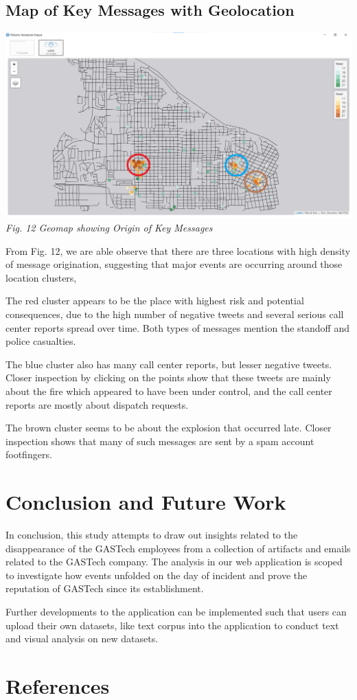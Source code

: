 \documentclass{acm_proc_article-sp}
\begin{document}
\hypertarget{map-of-key-messages-with-geolocation}{%
\subsection{Map of Key Messages with
Geolocation}\label{map-of-key-messages-with-geolocation}}

\includegraphics{img/image11.png} \emph{Fig. 12 Geomap showing Origin of
Key Messages}

From Fig. 12, we are able observe that there are three locations with
high density of message origination, suggesting that major events are
occurring around those location clusters,

The red cluster appears to be the place with highest risk and potential
consequences, due to the high number of negative tweets and several
serious call center reports spread over time. Both types of messages
mention the standoff and police casualties.

The blue cluster also has many call center reports, but lesser negative
tweets. Closer inspection by clicking on the points show that these
tweets are mainly about the fire which appeared to have been under
control, and the call center reports are mostly about dispatch requests.

The brown cluster seems to be about the explosion that occurred late.
Closer inspection shows that many of such messages are sent by a spam
account footfingers.

\hypertarget{conclusion-and-future-work}{%
\section{Conclusion and Future Work}\label{conclusion-and-future-work}}

In conclusion, this study attempts to draw out insights related to the
disappearance of the GASTech employees from a collection of artifacts
and emails related to the GASTech company. The analysis in our web
application is scoped to investigate how events unfolded on the day of
incident and prove the reputation of GASTech since its establishment.

Further developments to the application can be implemented such that
users can upload their own datasets, like text corpus into the
application to conduct text and visual analysis on new datasets.

\hypertarget{references}{%
\section{References}\label{references}}
\setlength{\parindent}{0in}
\end{document}
